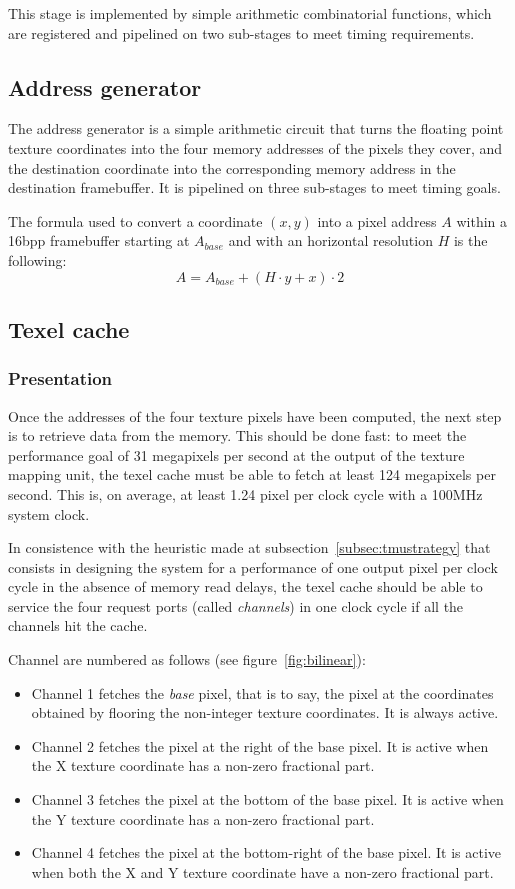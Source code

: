 \documentclass[a4paper,11pt]{kthesis}
\begin{document}
This stage is implemented by simple arithmetic combinatorial functions, which are registered and pipelined on two sub-stages to meet timing requirements.

\subsection{Address generator}
The address generator is a simple arithmetic circuit that turns the floating point texture coordinates into the four memory addresses of the pixels they cover, and the destination coordinate into the corresponding memory address in the destination framebuffer. It is pipelined on three sub-stages to meet timing goals.

The formula used to convert a coordinate $(x,y)$ into a pixel address $A$ within a 16bpp framebuffer starting at $A_{base}$ and with an horizontal resolution $H$ is the following:
\begin{equation}\label{eq:fbadr}
A = A_{base} + (H \cdot y + x) \cdot 2
\end{equation}

\subsection{Texel cache}
\label{subsec:texelcache}
\subsubsection{Presentation}
Once the addresses of the four texture pixels have been computed, the next step is to retrieve data from the memory. This should be done fast: to meet the performance goal of 31 megapixels per second at the output of the texture mapping unit, the texel cache must be able to fetch at least 124 megapixels per second. This is, on average, at least 1.24 pixel per clock cycle with a 100MHz system clock.

In consistence with the heuristic made at subsection~\ref{subsec:tmustrategy} that consists in designing the system for a performance of one output pixel per clock cycle in the absence of memory read delays, the texel cache should be able to service the four request ports (called \textit{channels}) in one clock cycle if all the channels hit the cache.

Channel are numbered as follows (see figure~\ref{fig:bilinear}):
\begin{itemize}
\item Channel 1 fetches the \textit{base} pixel, that is to say, the pixel at the coordinates obtained by flooring the non-integer texture coordinates. It is always active.
\item Channel 2 fetches the pixel at the right of the base pixel. It is active when the X texture coordinate has a non-zero fractional part.
\item Channel 3 fetches the pixel at the bottom of the base pixel. It is active when the Y texture coordinate has a non-zero fractional part.
\item Channel 4 fetches the pixel at the bottom-right of the base pixel. It is active when both the X and Y texture coordinate have a non-zero fractional part.
\end{itemize}
\end{document}
